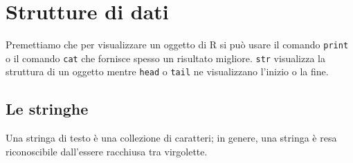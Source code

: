 \documentclass[onecolumn,12pt]{book}
\author{Federico Comoglio e  Maurizio Rinaldi}
\begin{document}

\markright{\today}
\thispagestyle{empty}
\maketitle
\newpage
\thispagestyle{empty}
\tableofcontents
\newpage
\thispagestyle{empty}
 \mainmatter

\chapter{Strutture di dati}
 
Premettiamo che per visualizzare un oggetto di \textsf{R} si pu\`o usare il comando \texttt{print} o il comando \texttt{cat} che fornisce spesso un risultato migliore. \texttt{str} visualizza la struttura di un oggetto mentre \texttt{head} o \texttt{tail} ne visualizzano l'inizio o la fine.


\section{Le stringhe}
Una stringa di testo \`e una collezione di caratteri; in genere, una stringa \`e resa riconoscibile dall'essere racchiusa tra virgolette.
\end{document}
